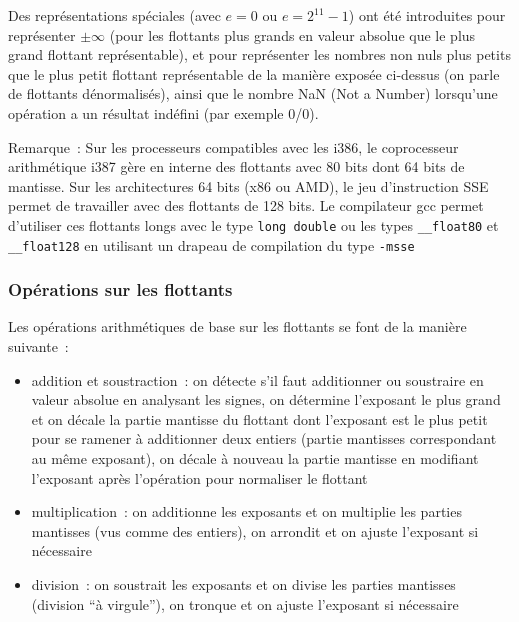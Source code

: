 \documentclass[a4paper,11pt]{article}
\begin{document}
\begin{giacjshere}
Des représentations spéciales (avec $e=0$ ou $e=2^{11}-1$) 
ont été introduites
pour représenter $\pm \infty$ (pour les flottants plus grands
en valeur absolue que le plus grand flottant représentable), et pour
repr\'esenter les
nombres non nuls plus petits que le plus petit flottant représentable
de la manière exposée ci-dessus (on parle de flottants dénormalisés),
ainsi que le nombre NaN (Not a Number) lorsqu'une opération a un résultat
indéfini (par exemple 0/0).

Remarque~: Sur les processeurs compatibles avec les i386, 
le coprocesseur arithmétique i387 gère en interne des flottants
avec 80 bits dont 64 bits de mantisse. Sur les architectures 64 bits
(x86 ou AMD), le jeu d'instruction SSE permet de travailler avec
des flottants de 128 bits. Le compilateur gcc permet d'utiliser
ces flottants longs avec le type \verb|long double| ou
les types \verb|__float80| et \verb|__float128| en utilisant
un drapeau de compilation du type \verb|-msse|

\subsubsection{Op\'erations sur les flottants}
Les opérations arithmétiques de base sur les flottants
se font de la manière suivante~:
\begin{itemize}
\item addition et soustraction~: on détecte s'il faut additionner
ou soustraire en valeur absolue en analysant les signes,
on détermine l'exposant le plus grand et on décale la partie mantisse 
du flottant dont l'exposant est le plus petit pour se ramener à additionner
deux entiers (partie mantisses correspondant au même exposant), 
on décale à nouveau la partie mantisse en modifiant l'exposant 
après l'opération pour normaliser le flottant
\item multiplication~: on additionne les exposants et on multiplie
les parties mantisses (vus comme des entiers), on arrondit et
on ajuste l'exposant si nécessaire
\item division~: on soustrait les exposants et on divise les parties
mantisses (division ``à virgule''), on tronque et on
ajuste l'exposant si nécessaire
\end{itemize}


\end{giacjshere}
\end{document}
